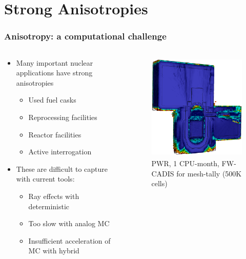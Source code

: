 \documentclass[xcolor=x11names,compress]{beamer}
\renewcommand{\(}{\begin{columns}}
\renewcommand{\)}{\end{columns}}
\newcommand{\<}[1]{\begin{column}{#1}}
\renewcommand{\>}{\end{column}}
\begin{document}
\section{Strong Anisotropies}
\begin{frame}[fragile]
  \frametitle{Anisotropy: a computational challenge}

	\begin{columns}
  	\begin{column}{0.5\textwidth}
	\begin{itemize}
	\item Many important nuclear applications have strong anisotropies
	 \begin{itemize}
	 \item Used fuel casks
	 \item Reprocessing facilities
	 \item Reactor facilities
	 \item Active interrogation 
	 \end{itemize}
	\item These are difficult to capture with current tools:
	 \begin{itemize}
	 \item Ray effects with deterministic
	 \item Too slow with analog MC
	 \item Insufficient acceleration of MC with hybrid
	 \end{itemize}
	\end{itemize}
  	\end{column}
 	\begin{column}{0.5\textwidth}
 	 \begin{center}
 	 \begin{figure}
 	 \includegraphics[height=2in,clip]{pwr}  
 	 \caption{PWR, 1 CPU-month, FW-CADIS  for mesh-tally (500K cells)}
 	 \end{figure}
 	 \end{center}

  	\end{column}
	\end{columns}

\end{frame}
\end{document}
